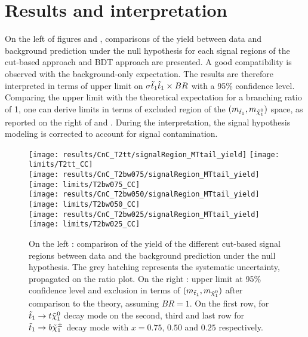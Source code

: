     \section{Results and interpretation \label{sec:analysis_results}}

    On the left of figures  and , comparisons
    of the yield between data and background prediction under the null hypothesis
    for each signal regions of the cut-based approach and BDT approach are presented.
    A good compatibility is observed with the background-only expectation. The results
    are therefore interpreted in terms of upper limit on $\sigma{\tilde{t}_1\tilde{t}_1} \times BR$
    with a 95\% confidence level.  Comparing the upper limit with the theoretical
    expectation for a branching ratio of 1, one can derive limits in terms of excluded
    region of the $(m_{\tilde{t}_1}, m_{\tilde{\chi}_1^0})$ space, as reported on the right
    of  and . During the interpretation,
    the signal hypothesis modeling is corrected to account for signal contamination.

    \begin{figure}[h!]
        \centering
        \texttt{[image: results/CnC\_T2tt/signalRegion\_MTtail\_yield]}
        \texttt{[image: limits/T2tt\_CC]}\\
        \texttt{[image: results/CnC\_T2bw075/signalRegion\_MTtail\_yield]}
        \texttt{[image: limits/T2bw075\_CC]}\\
        \texttt{[image: results/CnC\_T2bw050/signalRegion\_MTtail\_yield]}
        \texttt{[image: limits/T2bw050\_CC]}\\
        \texttt{[image: results/CnC\_T2bw025/signalRegion\_MTtail\_yield]}
        \texttt{[image: limits/T2bw025\_CC]}\\
        \caption{On the left : comparison of the yield of the different cut-based signal
        regions between data and the background prediction under the null hypothesis. The
        grey hatching represents the systematic uncertainty, propagated on the ratio plot.
        On the right : upper limit at 95\% confidence level and exclusion in terms of
        $(m_{\tilde{t}_1},m_{\tilde{\chi}_1^0})$ after comparison to the theory, assuming
        $BR = 1$. On the first row, for $\tilde{t}_1 \rightarrow t \tilde{\chi}_1^0$ decay mode on
        the second, third and last row for $\tilde{t}_1 \rightarrow b \tilde{\chi}_1^\pm$ decay mode
        with $x=0.75$, $0.50$ and $0.25$ respectively.}
        \label{fig:resultsCnC}
    \end{figure}

